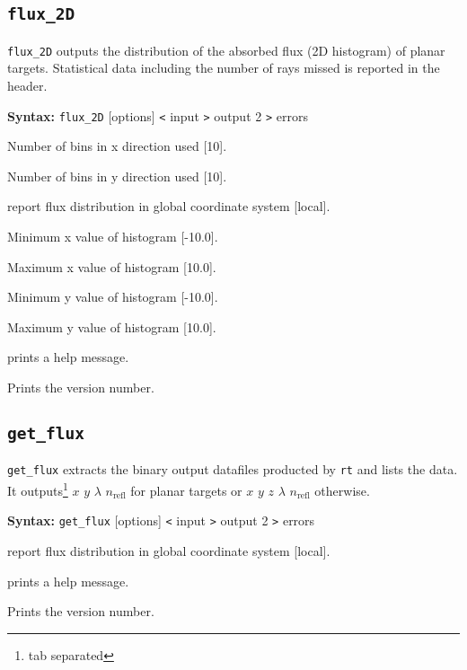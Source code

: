 \documentclass[10pt,a4paper,titlepage]{article}
\begin{document}
\subsection{{\tt flux\_2D}}
{\tt flux\_2D} outputs the distribution of the absorbed flux (2D histogram) of planar targets. Statistical data including the number of rays missed is reported in the header.

{\bf Syntax:} {\tt flux\_2D} [options] {\tt <} input {\tt >} output 2 {\tt >} errors
\vspace{1em}
\begin{list}{}
{\setlength{\leftmargin}{3.5cm}
\setlength{\labelwidth}{3.0cm}
\setlength{\labelsep}{0.25cm}
\setlength{\rightmargin}{0.5cm}}

\item[{\tt [--nx|-a]}] Number of bins in x direction used [10].
\item[{\tt [--ny|-b]}] Number of bins in y direction used [10].
\item[{\tt [--global|-g]}] report flux distribution in global coordinate system [local].
\item[{\tt [--minx|-x]}] Minimum x value of histogram [-10.0].
\item[{\tt [--maxx|-X]}] Maximum x value of histogram [10.0].
\item[{\tt [--miny|-y]}] Minimum y value of histogram [-10.0].
\item[{\tt [--maxy|-Y]}] Maximum y value of histogram [10.0].
\item[{\tt [--help|-h]}] prints a help message.
\item[{\tt [--Version|-V]}] Prints the version number.

\end{list}

\subsection{{\tt get\_flux}}
{\tt get\_flux} extracts the binary output datafiles producted by {\tt rt} and lists the data. It outputs\footnote{tab separated} $x$ $y$ $\lambda$ $n_{\mathrm{refl}}$ for planar targets or $x$ $y$ $z$ $\lambda$ $n_{\mathrm{refl}}$ otherwise.

{\bf Syntax:} {\tt get\_flux} [options] {\tt <} input {\tt >} output 2 {\tt >} errors
\vspace{1em}
\begin{list}{}
{\setlength{\leftmargin}{3.5cm}
\setlength{\labelwidth}{3.0cm}
\setlength{\labelsep}{0.25cm}
\setlength{\rightmargin}{0.5cm}}

\item[{\tt [--global|-g]}] report flux distribution in global coordinate system [local].
\item[{\tt [--help|-h]}] prints a help message.
\item[{\tt [--Version|-V]}] Prints the version number.

\end{list}
\end{document}
